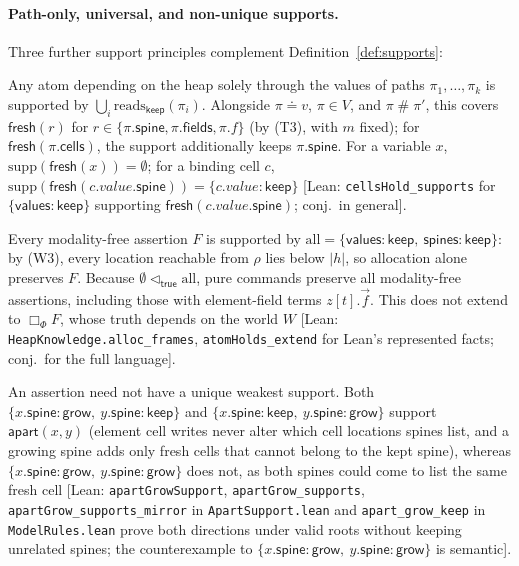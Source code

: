 \documentclass[10pt,a4paper]{article}
\theoremstyle{definition}
\theoremstyle{remark}
\newcommand{\bx}[1]{\Box_{#1}}
\newcommand{\sep}{\mathrel{\#}}
\newcommand{\kw}[1]{\mathsf{#1}}
\newcommand{\keep}{\kw{keep}}
\newcommand{\grow}{\kw{grow}}
\newcommand{\val}{\kw{values}}
\newcommand{\st}{\kw{spines}}
\newcommand{\fresh}{\kw{fresh}}
\newcommand{\apart}{\kw{apart}}
\newcommand{\len}[1]{|#1|}
\newcommand{\resp}{\mathrel{\triangleleft}}
\newcommand{\lean}[1]{\texttt{\small #1}}
\newcommand{\status}[1]{\textsf{\small[#1]}}
\begin{document}
\paragraph{Path-only, universal, and non-unique supports.}
Three further support principles complement Definition~\ref{def:supports}:
\begin{description}[leftmargin=1.5em,style=nextline]
\item[Path-only assertions] Any atom depending on the heap solely through
the values of paths $\pi_1,\dots,\pi_k$ is supported by
$\bigcup_i\mathrm{reads}_{\keep}(\pi_i)$. Alongside $\pi\doteq v$,
$\pi\in V$, and $\pi\sep\pi'$, this covers $\fresh(r)$ for
$r\in\{\pi.\kw{spine},\pi.\kw{fields},\pi.f\}$ (by (T3), with $m$ fixed);
for $\fresh(\pi.\kw{cells})$, the support additionally keeps
$\pi.\kw{spine}$. For a variable $x$, $\mathrm{supp}(\fresh(x))=\emptyset$;
for a binding cell $c$,
$\mathrm{supp}(\fresh(c.\mathit{value}.\kw{spine}))=\{c.\mathit{value}:\keep\}$
\status{Lean: \lean{cellsHold\_supports} for $\{\val:\keep\}$ supporting $\fresh(c.\mathit{value}.\kw{spine})$; conj.\ in general}.
\item[Universal support for modality-free assertions] Every modality-free
assertion $F$ is supported by $\mathrm{all}=\{\val:\keep,\ \st:\keep\}$:
by (W3), every location reachable from $\rho$ lies below $\len h$, so
allocation alone preserves $F$. Because $\emptyset\resp_{\kw{true}}\mathrm{all}$,
pure commands preserve all modality-free assertions, including those with
element-field terms $z[t].\vec f$. This does not extend to $\bx{\Phi}F$,
whose truth depends on the world $W$
\status{Lean: \lean{HeapKnowledge.alloc\_frames}, \lean{atomHolds\_extend} for Lean's represented facts; conj.\ for the full language}.
\item[Multiple incomparable supports] An assertion need not have a unique
weakest support. Both $\{x.\kw{spine}:\grow,\ y.\kw{spine}:\keep\}$ and
$\{x.\kw{spine}:\keep,\ y.\kw{spine}:\grow\}$ support $\apart(x,y)$
(element cell writes never alter which cell locations spines list, and a
growing spine adds only fresh cells that cannot belong to the kept spine),
whereas $\{x.\kw{spine}:\grow,\ y.\kw{spine}:\grow\}$ does not, as both
spines could come to list the same fresh cell
\status{Lean: \lean{apartGrowSupport}, \lean{apartGrow\_supports}, \lean{apartGrow\_supports\_mirror} in \lean{ApartSupport.lean} and \lean{apart\_grow\_keep} in \lean{ModelRules.lean} prove both directions under valid roots without keeping unrelated spines; the counterexample to $\{x.\kw{spine}:\grow,\ y.\kw{spine}:\grow\}$ is semantic}.
\end{description}
\end{document}
